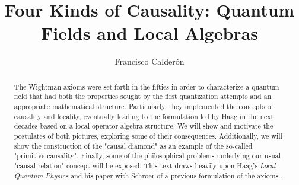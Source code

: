 \documentclass[12pt]{article}
\date{}
\title{Four Kinds of Causality: Quantum Fields and Local Algebras}
\author{Francisco Calderón}
\begin{document}
\maketitle

\begin{abstract}
The Wightman axioms were set forth in the fifties in order to characterize a quantum field that had both the properties sought by the first quantization attempts and an appropriate mathematical structure. Particularly, they implemented the concepts of causality and locality, eventually leading to the formulation led by Haag in the next decades based on a local operator algebra structure. We will show and motivate the postulates of both pictures, exploring some of their consequences. Additionally, we will show the construction of the "causal diamond" as an example of the so-called "primitive causality". Finally, some of the philosophical problems underlying our usual "causal relation" concept will be exposed. This text draws heavily upon Haag's \textit{Local Quantum Physics} \cite{haag_local_1996} and his paper with Schroer of a previous formulation of the axioms \cite{haag_postulates_1962}.
\end{abstract}
\end{document}
